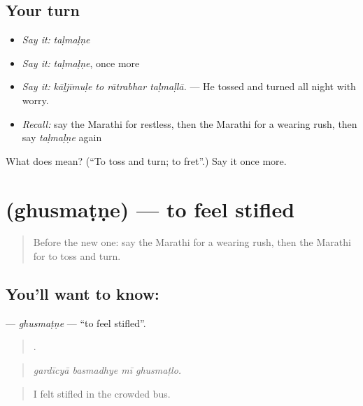 \subsection*{Your turn}
\begin{itemize}
\raggedright
  \item \emph{Say it:} \emph{taḷmaḷṇe}
  \item \emph{Say it:} \emph{taḷmaḷṇe}, once more
  \item \emph{Say it:} \emph{kāḷjīmuḷe to rātrabhar taḷmaḷlā.} — He tossed and turned all night with worry.
  \item \emph{Recall:} say the Marathi for restless, then the Marathi for a wearing rush, then say \emph{taḷmaḷṇe} again
\end{itemize}

\begin{tcolorbox}[breakable,colback=teal!4,colframe=teal!35!black,title={Before you move on}]
What does  mean? (\textquotedblleft{}To toss and turn; to fret\textquotedblright{}.) Say it once more.
\end{tcolorbox}
\section[\texorpdfstring{\mr{घुसमटणे} (ghusmaṭṇe)}{घुसमटणे (ghusmaṭṇe)}]{ (ghusmaṭṇe) — to feel stifled}

\label{lesson:MR-C455-ghusmatne}



\begin{quote}
Before the new one: say the Marathi for a wearing rush, then the Marathi for to toss and turn.
\end{quote}

\subsection*{You'll want to know: }
\textbf{} — \emph{ghusmaṭṇe} — \textquotedblleft{}to feel stifled\textquotedblright{}.

\begin{quote}
   .
\end{quote}

\begin{quote}
\emph{gardīcyā basmadhye mī ghusmaṭlo.}
\end{quote}

\begin{quote}
I felt stifled in the crowded bus.
\end{quote}


